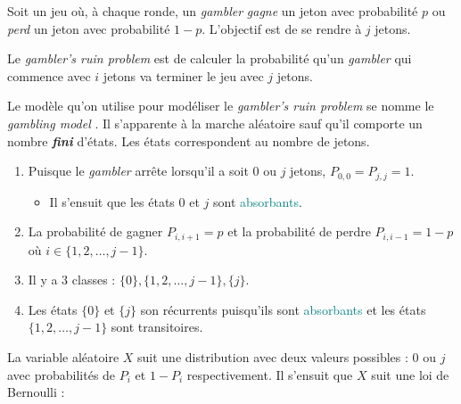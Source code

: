 \documentclass[french]{article}
\begin{document}
\begin{multicols*}{2}
\begin{definitionNOHFILL}
Soit un jeu où, à chaque ronde, un \og \textit{gambler} \fg{} \textit{gagne} un jeton avec probabilité $p$ ou \textit{perd} un jeton avec probabilité $1 - p$. L'objectif est de se rendre à $j$ jetons.

\bigskip

Le \og \textit{gambler's ruin problem} \fg{} est de calculer la probabilité qu'un \og \textit{gambler} \fg{} qui commence avec $i$ jetons va terminer le jeu avec $j$ jetons.
\end{definitionNOHFILL}

\begin{definitionNOHFILLsub}
Le modèle qu'on utilise pour modéliser le \og \textit{gambler's ruin problem} \fg{} se nomme le \og \textit{gambling model} \fg{}. Il s'apparente à la marche aléatoire sauf qu'il comporte un nombre \textbf{\textit{fini}} d'états. Les états correspondent au nombre de jetons.

\bigskip

\begin{definitionNOHFILLpropos}
\begin{enumerate}[label = \circled{\arabic*}{trueblue}]
	\item	Puisque le \og \textit{gambler} \fg{} arrête lorsqu'il a soit $0$ ou $j$ jetons, $P_{0, 0} = P_{j, j} = 1$.
		\begin{itemize}
		\item	Il s'ensuit que les états $0$ et $j$ sont \textcolor{teal}{absorbants}.
		\end{itemize}
	\item	La probabilité de gagner $P_{i, i + 1} = p$ et la probabilité de perdre $P_{i, i - 1} = 1 - p$ où $i \in \{1, 2, \dots, j - 1\}$.
	\item	Il y a 3 classes : $\{0\}, \{1, 2, \dots, j - 1\}, \{j\}$.
	\item	Les états $\{0\}$ et $\{j\}$ son récurrents puisqu'ils sont \textcolor{teal}{absorbants} et les états $\{1, 2, \dots, j - 1\}$ sont transitoires.
\end{enumerate}
\end{definitionNOHFILLpropos}
\end{definitionNOHFILLsub}

\begin{definitionNOHFILLprop}
La variable aléatoire $X$ suit une distribution avec deux valeurs possibles : $0$ ou $j$ avec probabilités de $P_{i}$ et $1 - P_{i}$ respectivement. Il s'ensuit que $X$ suit une loi de Bernoulli : 


\end{definitionNOHFILLprop}
\end{multicols*}
\end{document}
